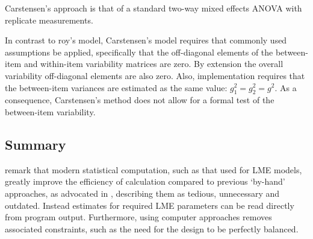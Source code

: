 \documentclass[12pt, a4paper]{report}
\theoremstyle{plain}
\theoremstyle{definition}
\theoremstyle{remark}
\begin{document}
	Carstensen's approach is that of a standard two-way mixed effects ANOVA with replicate measurements.
	
	In contrast to roy's model, Carstensen's model requires that commonly used assumptions be applied, specifically that the off-diagonal elements of the between-item and within-item variability matrices are zero. By
	extension the overall variability off-diagonal elements are also zero. 
	Also, implementation requires that the between-item variances are estimated as the same value: $g^2_1 = g^2_2 = g^2$.
	As a consequence, Carstensen's method does not allow for a formal test of the between-item variability.
	
	
	\subsection{Summary}	
	\citet{BXC2008} remark that modern statistical computation, such as that used for LME models, greatly improve the efficiency of calculation compared to previous `by-hand' approaches, as advocated in \citet{BA99}, describing them as tedious, unnecessary and outdated. Instead estimates for required LME parameters can be read directly from program output. Furthermore, using computer approaches removes associated constraints, such as the need for the design to be perfectly balanced.
	
	
	
	
	
	
	
	
	
\end{document}
